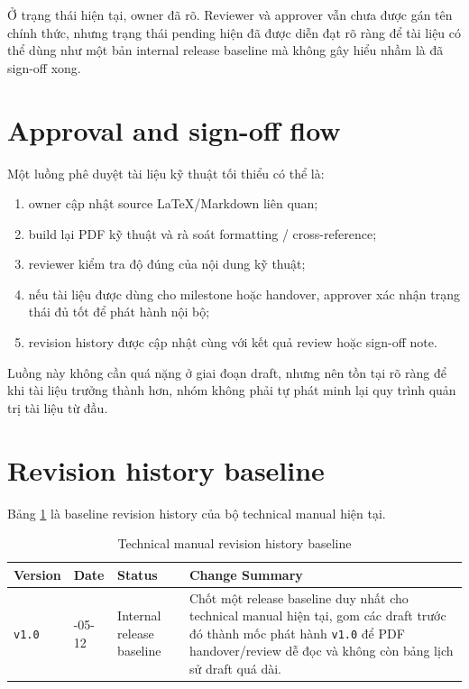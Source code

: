 Ở trạng thái hiện tại, owner đã rõ. Reviewer và approver vẫn chưa được gán tên chính thức, nhưng trạng thái pending hiện đã được diễn đạt rõ ràng để tài liệu có thể dùng như một bản internal release baseline mà không gây hiểu nhầm là đã sign-off xong.

\section{Approval and sign-off flow}

Một luồng phê duyệt tài liệu kỹ thuật tối thiểu có thể là:

\begin{enumerate}[label=-]
\item owner cập nhật source LaTeX/Markdown liên quan;
\item build lại PDF kỹ thuật và rà soát formatting / cross-reference;
\item reviewer kiểm tra độ đúng của nội dung kỹ thuật;
\item nếu tài liệu được dùng cho milestone hoặc handover, approver xác nhận trạng thái đủ tốt để phát hành nội bộ;
\item revision history được cập nhật cùng với kết quả review hoặc sign-off note.
\end{enumerate}

Luồng này không cần quá nặng ở giai đoạn draft, nhưng nên tồn tại rõ ràng để khi tài liệu trưởng thành hơn, nhóm không phải tự phát minh lại quy trình quản trị tài liệu từ đầu.

\section{Revision history baseline}

Bảng \ref{tab:revision_history} là baseline revision history của bộ technical manual hiện tại.

\begin{table}[htbp]
	\centering
	\renewcommand{\arraystretch}{1.3}
	\caption{Technical manual revision history baseline}
	\label{tab:revision_history}
	\begin{tabularx}{\linewidth}{|>{\RaggedRight\arraybackslash}p{2.2cm}|>{\RaggedRight\arraybackslash}p{2.0cm}|>{\RaggedRight\arraybackslash}p{2.6cm}|>{\RaggedRight\arraybackslash}X|}
		\hline
		\textbf{Version} & \textbf{Date} & \textbf{Status} & \textbf{Change Summary} \\ \hline
		\texttt{v1.0} & 2026-05-12 & Internal release baseline & Chốt một release baseline duy nhất cho technical manual hiện tại, gom các draft trước đó thành mốc phát hành \texttt{v1.0} để PDF handover/review dễ đọc và không còn bảng lịch sử draft quá dài. \\ \hline
	\end{tabularx}
\end{table}

